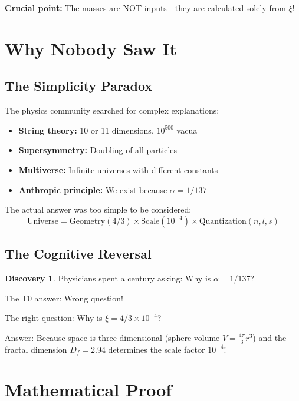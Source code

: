 \documentclass[12pt,a4paper]{article}
\theoremstyle{definition}
\newtheorem{discovery}{Discovery}[section]
\begin{document}
	\textbf{Crucial point:} The masses are NOT inputs - they are calculated solely from $\xi$!
	
	\section{Why Nobody Saw It}
	
	\subsection{The Simplicity Paradox}
	
	The physics community searched for complex explanations:
	
	\begin{itemize}
		\item \textbf{String theory:} 10 or 11 dimensions, $10^{500}$ vacua
		\item \textbf{Supersymmetry:} Doubling of all particles
		\item \textbf{Multiverse:} Infinite universes with different constants
		\item \textbf{Anthropic principle:} We exist because $\alpha = 1/137$
	\end{itemize}
	
	The actual answer was too simple to be considered:
	\begin{equation}
		\boxed{\text{Universe} = \text{Geometry}(4/3) \times \text{Scale}(10^{-4}) \times \text{Quantization}(n,l,s)}
	\end{equation}
	
	\subsection{The Cognitive Reversal}
	
	\begin{discovery}
		Physicians spent a century asking: Why is $\alpha = 1/137$?
		
		The T0 answer: Wrong question!
		
		The right question: Why is $\xi = 4/3 \times 10^{-4}$?
		
		Answer: Because space is three-dimensional (sphere volume $V = \frac{4\pi}{3} r^3$) and the fractal dimension $D_f = 2.94$ determines the scale factor $10^{-4}$!
	\end{discovery}
	
	\section{Mathematical Proof}
	
\end{document}
